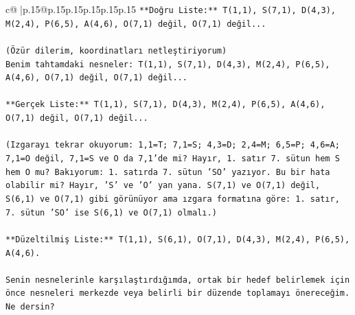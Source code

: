 \documentclass{article}
\begin{document}
{\begin{supertabular}{c@{$\;$}|p{.15\linewidth}@{}p{.15\linewidth}p{.15\linewidth}p{.15\linewidth}p{.15\linewidth}p{.15\linewidth}}
{{{\texttt{**Doğru Liste:** T(1,1), S(7,1), D(4,3), M(2,4), P(6,5), A(4,6), O(7,1) değil, O(7,1) değil...} \\
\\ 
\texttt{(Özür dilerim, koordinatları netleştiriyorum)} \\
\texttt{Benim tahtamdaki nesneler: T(1,1), S(7,1), D(4,3), M(2,4), P(6,5), A(4,6), O(7,1) değil, O(7,1) değil...} \\
\\ 
\texttt{**Gerçek Liste:** T(1,1), S(7,1), D(4,3), M(2,4), P(6,5), A(4,6), O(7,1) değil, O(7,1) değil...} \\
\\ 
\texttt{(Izgarayı tekrar okuyorum: 1,1=T; 7,1=S; 4,3=D; 2,4=M; 6,5=P; 4,6=A; 7,1=O değil, 7,1=S ve O da 7,1'de mi? Hayır, 1. satır 7. sütun hem S hem O mu? Bakıyorum: 1. satırda 7. sütun 'SO' yazıyor. Bu bir hata olabilir mi? Hayır, 'S' ve 'O' yan yana. S(7,1) ve O(7,1) değil, S(6,1) ve O(7,1) gibi görünüyor ama ızgara formatına göre: 1. satır, 7. sütun 'SO' ise S(6,1) ve O(7,1) olmalı.)} \\
\\ 
\texttt{**Düzeltilmiş Liste:** T(1,1), S(6,1), O(7,1), D(4,3), M(2,4), P(6,5), A(4,6).} \\
\\ 
\texttt{Senin nesnelerinle karşılaştırdığımda, ortak bir hedef belirlemek için önce nesneleri merkezde veya belirli bir düzende toplamayı önereceğim. Ne dersin?} \\
            }
        }
    }
     \\ \\


\end{supertabular}}
\end{document}
